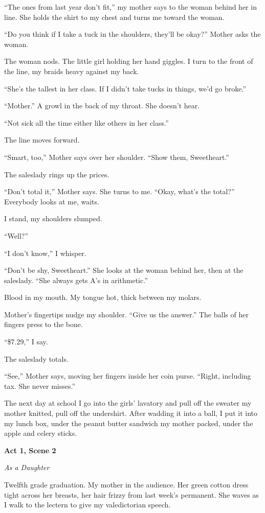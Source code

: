 \documentclass[
]{article}
\begin{document}
``The ones from last year don't fit,'' my mother says to the woman
behind her in line. She holds the shirt to my chest and turns me toward
the woman.

``Do you think if I take a tuck in the shoulders, they'll be okay?''
Mother asks the woman.

The woman nods. The little girl holding her hand giggles. I turn to the
front of the line, my braids heavy against my back.

``She's the tallest in her class. If I didn't take tucks in things, we'd
go broke.''

``Mother.'' A growl in the back of my throat. She doesn't hear.

``Not sick all the time either like others in her class.''

The line moves forward.

``Smart, too,'' Mother says over her shoulder. ``Show them,
Sweetheart.''

The saleslady rings up the prices.

``Don't total it,'' Mother says. She turns to me. ``Okay, what's the
total?'' Everybody looks at me, waits.

I stand, my shoulders slumped.

``Well?''

``I don't know,'' I whisper.

``Don't be shy, Sweetheart.'' She looks at the woman behind her, then at
the saleslady. ``She always gets A's in arithmetic.''

Blood in my mouth. My tongue hot, thick between my molars.

Mother's fingertips nudge my shoulder. ``Give us the answer.'' The balls
of her fingers press to the bone.

``\$7.29,'' I say.

The saleslady totals.

``See,'' Mother says, moving her fingers inside her coin purse. ``Right,
including tax. She never misses.''

The next day at school I go into the girls' lavatory and pull off the
sweater my mother knitted, pull off the undershirt. After wadding it
into a ball, I put it into my lunch box, under the peanut butter
sandwich my mother packed, under the apple and celery sticks.

\textbf{Act 1, Scene 2}

\emph{As a Daughter}

Twelfth grade graduation. My mother in the audience. Her green cotton
dress tight across her breasts, her hair frizzy from last week's
permanent. She waves as I walk to the lectern to give my valedictorian
speech.
\end{document}
